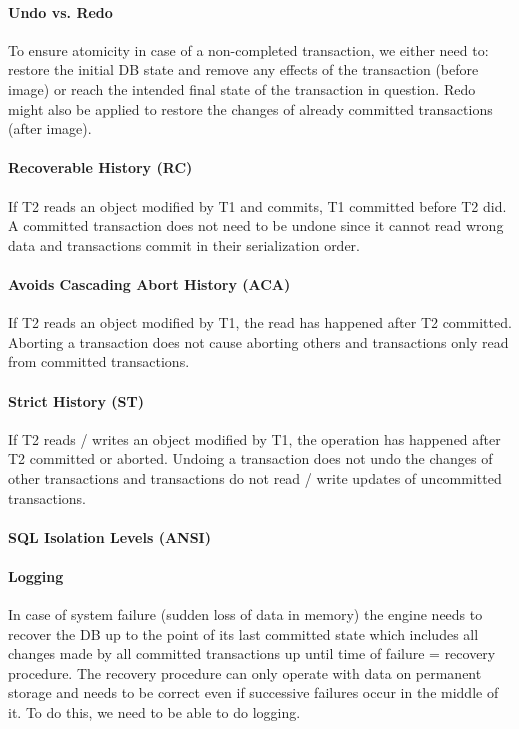 \paragraph{Undo vs. Redo}
To ensure atomicity in case of a non-completed transaction, we either need to: restore the initial DB state and remove any effects of the transaction (before image) or reach the intended final state of the transaction in question. Redo might also be applied to restore the changes of already committed transactions (after image).

\paragraph{Recoverable History (RC)}
If T2 reads an object modified by T1 and commits, T1 committed before T2 did. A committed transaction does not need to be undone since it cannot read wrong data and transactions commit in their serialization order.

\paragraph{Avoids Cascading Abort History (ACA)}
If T2 reads an object modified by T1, the read has happened after T2 committed. Aborting a transaction does not cause aborting others and transactions only read from committed transactions.

\paragraph{Strict History (ST)}
If T2 reads / writes an object modified by T1, the operation has happened after T2 committed or aborted. Undoing a transaction does not undo the changes of other transactions and transactions do not read / write updates of uncommitted transactions.

\paragraph{SQL Isolation Levels (ANSI)}

\paragraph{Logging}
In case of system failure (sudden loss of data in memory) the engine needs to recover the DB up to the point of its last committed state which includes all changes made by all committed transactions up until time of failure = recovery procedure. The recovery procedure can only operate with data on permanent storage and needs to be correct even if successive failures occur in the middle of it. To do this, we need to be able to do logging.

